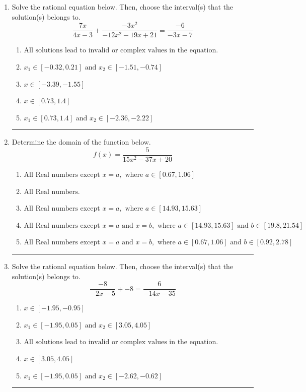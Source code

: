 \documentclass[14pt]{extbook}
\newcommand{\litem}[1]{\item#1\hspace*{-1cm}\rule{\textwidth}{0.4pt}}
\begin{document}
\begin{enumerate}
{\begin{enumerate}[label=\Alph*.]
\end{enumerate} }
\litem{
Solve the rational equation below. Then, choose the interval(s) that the solution(s) belongs to.\[ \frac{7x}{4x -3} + \frac{-3x^{2}}{-12x^{2} -19 x + 21} = \frac{-6}{-3x -7} \]\begin{enumerate}[label=\Alph*.]
\item \( \text{All solutions lead to invalid or complex values in the equation.} \)
\item \( x_1 \in [-0.32, 0.21] \text{ and } x_2 \in [-1.51,-0.74] \)
\item \( x \in [-3.39,-1.55] \)
\item \( x \in [0.73,1.4] \)
\item \( x_1 \in [0.73, 1.4] \text{ and } x_2 \in [-2.36,-2.22] \)

\end{enumerate} }
\litem{
Determine the domain of the function below.\[ f(x) = \frac{5}{15x^{2} -37 x + 20} \]\begin{enumerate}[label=\Alph*.]
\item \( \text{All Real numbers except } x = a, \text{ where } a \in [0.67, 1.06] \)
\item \( \text{All Real numbers.} \)
\item \( \text{All Real numbers except } x = a, \text{ where } a \in [14.93, 15.63] \)
\item \( \text{All Real numbers except } x = a \text{ and } x = b, \text{ where } a \in [14.93, 15.63] \text{ and } b \in [19.8, 21.54] \)
\item \( \text{All Real numbers except } x = a \text{ and } x = b, \text{ where } a \in [0.67, 1.06] \text{ and } b \in [0.92, 2.78] \)

\end{enumerate} }
\litem{
Solve the rational equation below. Then, choose the interval(s) that the solution(s) belongs to.\[ \frac{-8}{-2x -5} + -8 = \frac{6}{-14x -35} \]\begin{enumerate}[label=\Alph*.]
\item \( x \in [-1.95,-0.95] \)
\item \( x_1 \in [-1.95, 0.05] \text{ and } x_2 \in [3.05,4.05] \)
\item \( \text{All solutions lead to invalid or complex values in the equation.} \)
\item \( x \in [3.05,4.05] \)
\item \( x_1 \in [-1.95, 0.05] \text{ and } x_2 \in [-2.62,-0.62] \)


\end{enumerate}}
\end{enumerate}
\end{document}
